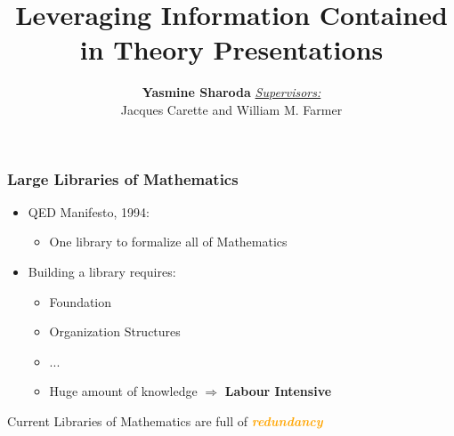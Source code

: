 \documentclass[t,10pt,numbers,fleqn,usenames,xcolor=dvipsnames]{beamer}
\title{Leveraging Information Contained in Theory Presentations}
\author{\textbf{Yasmine Sharoda} \newline 
\newline \underline{\textit{Supervisors:}} \vspace{0.5em}\\ 
Jacques Carette and William M. Farmer}
\date{}
\begin{document}
    
\frame{\titlepage}


\begin{frame}[fragile] 
\frametitle{Large Libraries of Mathematics}
\begin{itemize}
\item QED Manifesto, 1994: 
\begin{itemize}
\item One library to formalize all of Mathematics 
\end{itemize}
\vspace{0.3cm}
\pause
\item Building a library requires: 
\begin{itemize}
\item Foundation 
\item Organization Structures 
\item ... 
\item Huge amount of knowledge $\Rightarrow$ \textbf{Labour Intensive} 
\end{itemize}
\end{itemize}
\vfill 
\pause 
Current Libraries of Mathematics are full of \textcolor{Orange}{\textbf{\emph{redundancy}}}
\end{frame}

\end{document}
